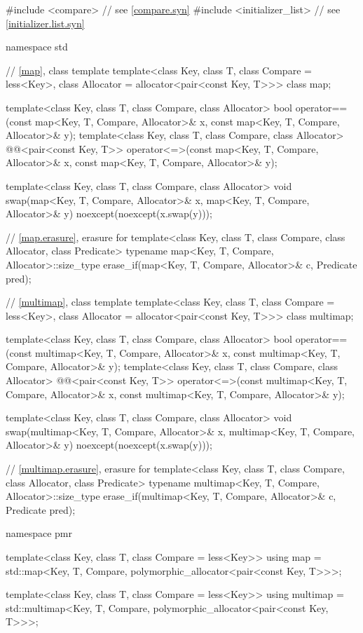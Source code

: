 %
\begin{codeblock}
#include <compare>              // see \ref{compare.syn}
#include <initializer_list>     // see \ref{initializer.list.syn}

namespace std {
  // \ref{map}, class template 
  template<class Key, class T, class Compare = less<Key>,
           class Allocator = allocator<pair<const Key, T>>>
    class map;

  template<class Key, class T, class Compare, class Allocator>
    bool operator==(const map<Key, T, Compare, Allocator>& x,
                    const map<Key, T, Compare, Allocator>& y);
  template<class Key, class T, class Compare, class Allocator>
    @@<pair<const Key, T>>
      operator<=>(const map<Key, T, Compare, Allocator>& x,
                  const map<Key, T, Compare, Allocator>& y);

  template<class Key, class T, class Compare, class Allocator>
    void swap(map<Key, T, Compare, Allocator>& x,
              map<Key, T, Compare, Allocator>& y)
      noexcept(noexcept(x.swap(y)));

  // \ref{map.erasure}, erasure for 
  template<class Key, class T, class Compare, class Allocator, class Predicate>
    typename map<Key, T, Compare, Allocator>::size_type
      erase_if(map<Key, T, Compare, Allocator>& c, Predicate pred);

  // \ref{multimap}, class template 
  template<class Key, class T, class Compare = less<Key>,
           class Allocator = allocator<pair<const Key, T>>>
    class multimap;

  template<class Key, class T, class Compare, class Allocator>
    bool operator==(const multimap<Key, T, Compare, Allocator>& x,
                    const multimap<Key, T, Compare, Allocator>& y);
  template<class Key, class T, class Compare, class Allocator>
    @@<pair<const Key, T>>
      operator<=>(const multimap<Key, T, Compare, Allocator>& x,
                  const multimap<Key, T, Compare, Allocator>& y);

  template<class Key, class T, class Compare, class Allocator>
    void swap(multimap<Key, T, Compare, Allocator>& x,
              multimap<Key, T, Compare, Allocator>& y)
      noexcept(noexcept(x.swap(y)));

  // \ref{multimap.erasure}, erasure for 
  template<class Key, class T, class Compare, class Allocator, class Predicate>
    typename multimap<Key, T, Compare, Allocator>::size_type
      erase_if(multimap<Key, T, Compare, Allocator>& c, Predicate pred);

  namespace pmr {
    template<class Key, class T, class Compare = less<Key>>
      using map = std::map<Key, T, Compare,
                           polymorphic_allocator<pair<const Key, T>>>;

    template<class Key, class T, class Compare = less<Key>>
      using multimap = std::multimap<Key, T, Compare,
                                     polymorphic_allocator<pair<const Key, T>>>;
  }
}
\end{codeblock}

